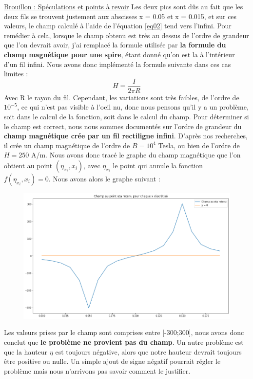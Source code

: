 \documentclass{article}
\begin{document}
\underline{Brouillon : Spéculations et points à revoir}
Les deux pics sont dûs au fait que les deux fils se trouvent justement aux abscisses x = 0.05 et x = 0.015, et sur ces valeurs, le champ calculé à l'aide de l'équation \eqref{eq02} tend vers l'infini. Pour remédier à cela, lorsque le champ obtenu est très au dessus de l'ordre de grandeur que l'on devrait avoir, j'ai remplacé la formule utilisée par \textbf{la formule du champ magnétique pour une spire}, étant donné qu'on est la à l'intérieur d'un fil infini. Nous avons donc implémenté la formule suivante dans ces cas limites : 
\begin{equation}
H = \frac{I}{2\pi R}
\label{eq06}
\end{equation}
Avec R le \underline{rayon du fil}.
\newline
Cependant, les variations sont très faibles, de l'ordre de $10^{-5}$, ce qui n'est pas visible à l'oeil nu, donc nous pensons qu'il y a un problème, soit dans le calcul de la fonction, soit dans le calcul du champ.
\newline
Pour déterminer si le champ est correct, nous nous sommes documentés sur l'ordre de grandeur du \textbf{champ magnétique crée par un fil rectiligne infini}. D'après nos recherches, il crée un champ magnétique de l'ordre de $ B = 10^{4}$ Tesla, ou bien de l'ordre de $H = 250$ A/m.
\newline
Nous avons donc tracé le graphe du champ magnétique que l'on obtient au point $(\eta_{x_{i}},x_{i})$, avec $\eta_{x_{i}}$ le point qui annule la fonction $f(\eta_{x_{i}},x_{i}) = 0$. Nous avons alors le graphe suivant :
\begin{figure}[h]
	\centering
    \includegraphics[width=.5\linewidth]{Champ.png}
    
\end{figure}
Les valeurs prises par le champ sont comprises entre [-300;300], nous avons donc conclut que \textbf{le problème ne provient pas du champ}.
\newline\newline
Un autre problème est que la hauteur $\eta$ est toujours négative, alors que notre hauteur devrait toujours être positive ou nulle. Un simple ajout de signe négatif pourrait régler le problème mais nous n'arrivons pas savoir comment le justifier. 
\end{document}
